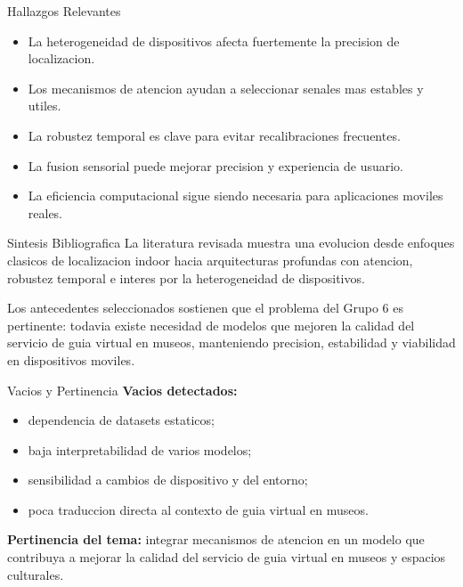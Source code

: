 \documentclass[aspectratio=169,11pt]{beamer}
\begin{document}
\begin{frame}{Hallazgos Relevantes}
\justifying
\begin{itemize}
  \item La heterogeneidad de dispositivos afecta fuertemente la precision de localizacion.
  \item Los mecanismos de atencion ayudan a seleccionar senales mas estables y utiles.
  \item La robustez temporal es clave para evitar recalibraciones frecuentes.
  \item La fusion sensorial puede mejorar precision y experiencia de usuario.
  \item La eficiencia computacional sigue siendo necesaria para aplicaciones moviles reales.
\end{itemize}
\end{frame}

\begin{frame}{Sintesis Bibliografica}
\justifying
La literatura revisada muestra una evolucion desde enfoques clasicos de localizacion indoor hacia arquitecturas profundas con atencion, robustez temporal e interes por la heterogeneidad de dispositivos.

\vspace{0.7em}

Los antecedentes seleccionados sostienen que el problema del Grupo 6 es pertinente: todavia existe necesidad de modelos que mejoren la calidad del servicio de guia virtual en museos, manteniendo precision, estabilidad y viabilidad en dispositivos moviles.
\end{frame}

\begin{frame}{Vacios y Pertinencia}
\justifying
\textbf{Vacios detectados:}
\begin{itemize}
  \item dependencia de datasets estaticos;
  \item baja interpretabilidad de varios modelos;
  \item sensibilidad a cambios de dispositivo y del entorno;
  \item poca traduccion directa al contexto de guia virtual en museos.
\end{itemize}

\vspace{0.6em}

\textbf{Pertinencia del tema:}
integrar mecanismos de atencion en un modelo que contribuya a mejorar la calidad del servicio de guia virtual en museos y espacios culturales.
\end{frame}
\end{document}
